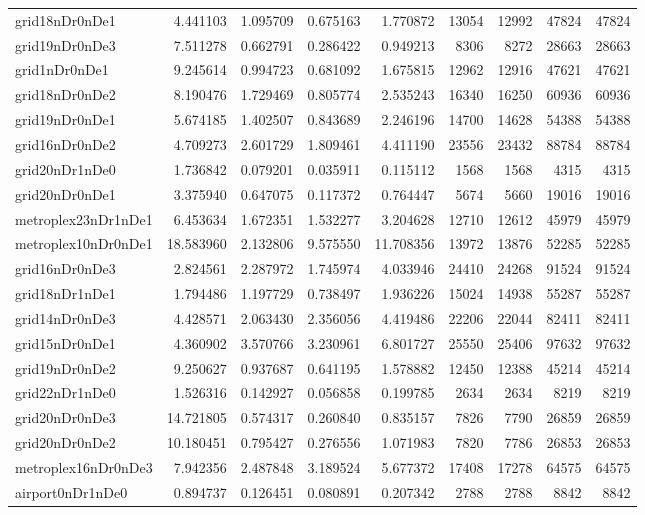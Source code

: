 \begin{longtable}{|l|r|r|r|r|r|r|r|r|}
grid18nDr0nDe1 & 4.441103 & 1.095709 & 0.675163 & 1.770872 & 13054 & 12992 & 47824 & 47824 \\
grid19nDr0nDe3 & 7.511278 & 0.662791 & 0.286422 & 0.949213 & 8306 & 8272 & 28663 & 28663 \\
grid1nDr0nDe1 & 9.245614 & 0.994723 & 0.681092 & 1.675815 & 12962 & 12916 & 47621 & 47621 \\
grid18nDr0nDe2 & 8.190476 & 1.729469 & 0.805774 & 2.535243 & 16340 & 16250 & 60936 & 60936 \\
grid19nDr0nDe1 & 5.674185 & 1.402507 & 0.843689 & 2.246196 & 14700 & 14628 & 54388 & 54388 \\
grid16nDr0nDe2 & 4.709273 & 2.601729 & 1.809461 & 4.411190 & 23556 & 23432 & 88784 & 88784 \\
grid20nDr1nDe0 & 1.736842 & 0.079201 & 0.035911 & 0.115112 & 1568 & 1568 & 4315 & 4315 \\
grid20nDr0nDe1 & 3.375940 & 0.647075 & 0.117372 & 0.764447 & 5674 & 5660 & 19016 & 19016 \\
metroplex23nDr1nDe1 & 6.453634 & 1.672351 & 1.532277 & 3.204628 & 12710 & 12612 & 45979 & 45979 \\
metroplex10nDr0nDe1 & 18.583960 & 2.132806 & 9.575550 & 11.708356 & 13972 & 13876 & 52285 & 52285 \\
grid16nDr0nDe3 & 2.824561 & 2.287972 & 1.745974 & 4.033946 & 24410 & 24268 & 91524 & 91524 \\
grid18nDr1nDe1 & 1.794486 & 1.197729 & 0.738497 & 1.936226 & 15024 & 14938 & 55287 & 55287 \\
grid14nDr0nDe3 & 4.428571 & 2.063430 & 2.356056 & 4.419486 & 22206 & 22044 & 82411 & 82411 \\
grid15nDr0nDe1 & 4.360902 & 3.570766 & 3.230961 & 6.801727 & 25550 & 25406 & 97632 & 97632 \\
grid19nDr0nDe2 & 9.250627 & 0.937687 & 0.641195 & 1.578882 & 12450 & 12388 & 45214 & 45214 \\
grid22nDr1nDe0 & 1.526316 & 0.142927 & 0.056858 & 0.199785 & 2634 & 2634 & 8219 & 8219 \\
grid20nDr0nDe3 & 14.721805 & 0.574317 & 0.260840 & 0.835157 & 7826 & 7790 & 26859 & 26859 \\
grid20nDr0nDe2 & 10.180451 & 0.795427 & 0.276556 & 1.071983 & 7820 & 7786 & 26853 & 26853 \\
metroplex16nDr0nDe3 & 7.942356 & 2.487848 & 3.189524 & 5.677372 & 17408 & 17278 & 64575 & 64575 \\
airport0nDr1nDe0 & 0.894737 & 0.126451 & 0.080891 & 0.207342 & 2788 & 2788 & 8842 & 8842 \\

\end{longtable}
